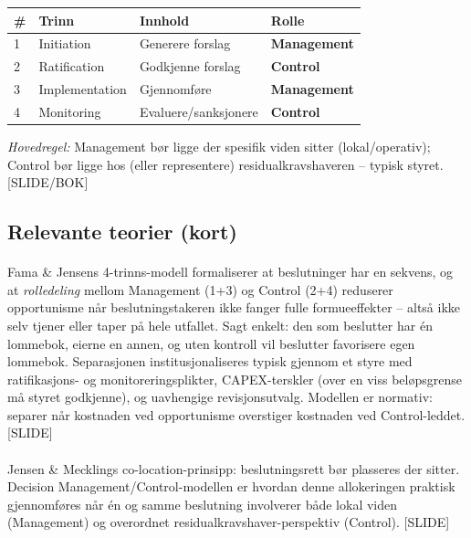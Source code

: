 \begin{center}
\renewcommand{\arraystretch}{1.2}
\begin{tabular}{@{}p{1.0cm}p{4.2cm}p{4.2cm}p{3.6cm}@{}}
\toprule
\textbf{\#} & \textbf{Trinn} & \textbf{Innhold} & \textbf{Rolle} \\
\midrule
1 & Initiation & Generere forslag & \textbf{Management} \\
2 & Ratification & Godkjenne forslag & \textbf{Control} \\
3 & Implementation & Gjennomføre & \textbf{Management} \\
4 & Monitoring & Evaluere/sanksjonere & \textbf{Control} \\
\bottomrule
\end{tabular}
\end{center}
\emph{Hovedregel:} Management bør ligge der spesifik viden sitter (lokal/operativ); Control bør ligge hos (eller representere) residualkravshaveren -- typisk styret. [SLIDE/BOK]

\subsection*{Relevante teorier (kort)}

\paragraph{\quad\SOne}
Fama \& Jensens 4-trinns-modell formaliserer at beslutninger har en sekvens, og at \emph{rolledeling} mellom Management (1+3) og Control (2+4) reduserer opportunisme når beslutningstakeren ikke fanger fulle formueeffekter -- altså ikke selv tjener eller taper på hele utfallet. Sagt enkelt: den som beslutter har én lommebok, eierne en annen, og uten kontroll vil beslutter favorisere egen lommebok. Separasjonen institusjonaliseres typisk gjennom et styre med ratifikasjons- og monitoreringsplikter, CAPEX-terskler (over en viss beløpsgrense må styret godkjenne), og uavhengige revisjonsutvalg. Modellen er normativ: separer når kostnaden ved opportunisme overstiger kostnaden ved Control-leddet. [SLIDE]

\paragraph{\quad\SOne}
Jensen \& Mecklings co-location-prinsipp: beslutningsrett bør plasseres der  sitter. Decision Management/Control-modellen er hvordan denne allokeringen praktisk gjennomføres når én og samme beslutning involverer både lokal viden (Management) og overordnet residualkravshaver-perspektiv (Control). [SLIDE]

